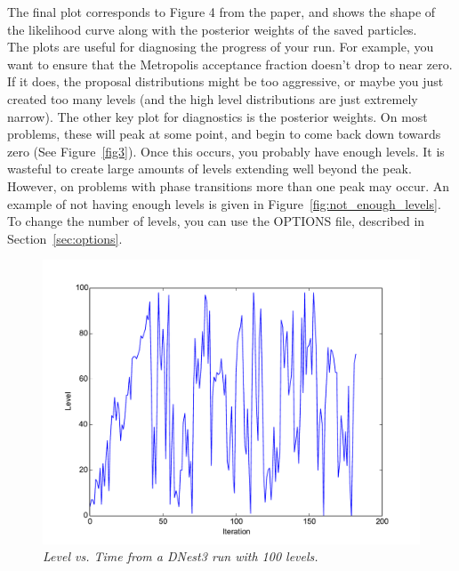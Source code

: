 \documentclass[a4paper, 11pt]{article}
\begin{document}
The final plot corresponds to Figure 4 from the paper, and
shows the shape of the likelihood curve along with the posterior weights of
the saved particles.\\

The plots are useful for diagnosing the progress of your run. For example, you
want to ensure that the Metropolis acceptance fraction doesn't drop to near
zero. If it does, the proposal distributions might be too aggressive, or maybe
you just created too many levels (and the high level distributions are just
extremely narrow). The other key plot for diagnostics is the posterior
weights. On most problems, these will peak at some point, and begin to
come back down towards zero (See Figure~\ref{fig3}).
Once this occurs, you probably have enough levels.
It is wasteful to create large amounts of levels extending well beyond the peak.
However, on problems with phase transitions more than one peak may occur.
An example of not having enough levels is given in
Figure~\ref{fig:not_enough_levels}. To change the number of levels, you
can use the OPTIONS file, described in Section~\ref{sec:options}.\\

\begin{figure}
\begin{center}
\includegraphics[scale=0.5]{fig1.pdf}
\caption{\it Level vs. Time from a DNest3 run with 100 levels.\label{fig:fig1}}
\end{center}
\end{figure}
\end{document}
